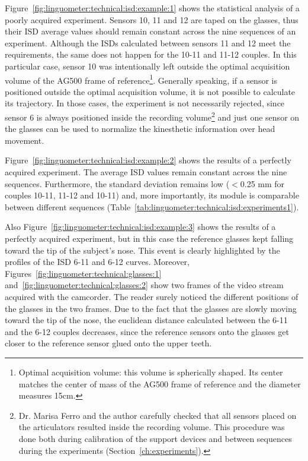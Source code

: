 
Figure~\ref{fig:linguometer:technical:isd:example:1} shows the statistical
analysis of a poorly acquired experiment.
Sensors 10, 11 and 12 are taped on the glasses, thus their ISD average values 
should remain constant across the nine sequences of an experiment.
Although the ISDs calculated between sensors 11 and 12 meet the requirements,
the same does not happen for the 10-11 and 11-12 couples.
In this particular case, sensor 10 was intentionally left outside the optimal 
acquisition volume of the AG500 frame of
reference\footnote{Optimal acquisition volume: this volume
is spherically shaped. Its center matches the center of mass of the
AG500 frame of reference and the diameter measures 15cm.}.
Generally speaking, if a sensor is positioned outside the optimal acquisition
volume, it is not possible to calculate its trajectory.
In those cases, the experiment is not necessarily rejected, since sensor 6 is
always positioned inside the recording 
volume\footnote{Dr. Marisa Ferro and the author carefully checked that all
sensors placed on the articulators resulted inside the recording volume.
This procedure was done both during calibration of the support devices and
between sequences during the experiments (Section~\ref{ch:experiments}).} 
and just one sensor on the glasses can be used to normalize the kinesthetic 
information over head movement.


Figure~\ref{fig:linguometer:technical:isd:example:2} shows the results of a
perfectly acquired experiment.
The average ISD values remain constant across the nine sequences. Furthermore,
the standard deviation remains low ($<$0.25 mm for couples 10-11, 11-12 and 
10-11) and, more importantly, its module is comparable between different 
sequences (Table~\ref{tab:linguometer:technical:isd:experiments1}).

Also Figure~\ref{fig:linguometer:technical:isd:example:3} shows the 
results of a perfectly acquired experiment, but in this case the reference
glasses kept falling toward the tip of the subject's nose.
This event is clearly highlighted by the profiles of the ISD 6-11 and 6-12
curves.
Moreover, Figures~\ref{fig:linguometer:technical:glasses:1}
and~\ref{fig:linguometer:technical:glasses:2} show two frames of the video
stream acquired with the camcorder. 
The reader surely noticed the different positions of the glasses in the two
frames. Due to the fact that the glasses are slowly moving toward the tip of 
the nose, the euclidean distance calculated between the 6-11 and
the 6-12 couples decreases, since the reference sensors onto the glasses get 
closer to the reference sensor glued onto the upper teeth.\\

